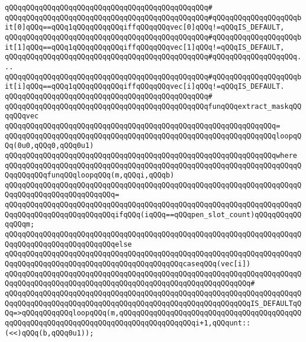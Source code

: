 \verb|qQQqqQQqqQQqqQQqqQQqqQQqqQQqqQQqqQQqqQQqqQQqqQQq#|\newline
\verb|qQQqqQQqqQQqqQQqqQQqqQQqqQQqqQQqqQQqqQQqqQQqqQQq#qQQqqQQqqQQqqQQqqQQqbit[0]qQQq==qQQq1qQQqqQQqqQQqiffqQQqqQQqvec[0]qQQq!=qQQqIS_DEFAULT,|\newline
\verb|qQQqqQQqqQQqqQQqqQQqqQQqqQQqqQQqqQQqqQQqqQQqqQQq#qQQqqQQqqQQqqQQqqQQqbit[1]qQQq==qQQq1qQQqqQQqqQQqiffqQQqqQQqvec[1]qQQq!=qQQqIS_DEFAULT,|\newline
\verb|qQQqqQQqqQQqqQQqqQQqqQQqqQQqqQQqqQQqqQQqqQQqqQQq#qQQqqQQqqQQqqQQqqQQq...|\newline
\verb|qQQqqQQqqQQqqQQqqQQqqQQqqQQqqQQqqQQqqQQqqQQqqQQq#qQQqqQQqqQQqqQQqqQQqbit[i]qQQq==qQQq1qQQqqQQqqQQqiffqQQqqQQqvec[i]qQQq!=qQQqIS_DEFAULT.|\newline
\verb|qQQqqQQqqQQqqQQqqQQqqQQqqQQqqQQqqQQqqQQqqQQqqQQq#|\newline
\verb|qQQqqQQqqQQqqQQqqQQqqQQqqQQqqQQqqQQqqQQqqQQqqQQqfunqQQqextract_maskqQQqqQQqvec|\newline
\verb|qQQqqQQqqQQqqQQqqQQqqQQqqQQqqQQqqQQqqQQqqQQqqQQqqQQqqQQqqQQqqQQq=|\newline
\verb|qQQqqQQqqQQqqQQqqQQqqQQqqQQqqQQqqQQqqQQqqQQqqQQqqQQqqQQqqQQqqQQqloopqQQq(0u0,qQQq0,qQQq0u1)|\newline
\verb|qQQqqQQqqQQqqQQqqQQqqQQqqQQqqQQqqQQqqQQqqQQqqQQqqQQqqQQqqQQqqQQqwhere|\newline
\verb|qQQqqQQqqQQqqQQqqQQqqQQqqQQqqQQqqQQqqQQqqQQqqQQqqQQqqQQqqQQqqQQqqQQqqQQqqQQqqQQqfunqQQqloopqQQq(m,qQQqi,qQQqb)|\newline
\verb|qQQqqQQqqQQqqQQqqQQqqQQqqQQqqQQqqQQqqQQqqQQqqQQqqQQqqQQqqQQqqQQqqQQqqQQqqQQqqQQqqQQqqQQqqQQqqQQq=|\newline
\verb|qQQqqQQqqQQqqQQqqQQqqQQqqQQqqQQqqQQqqQQqqQQqqQQqqQQqqQQqqQQqqQQqqQQqqQQqqQQqqQQqqQQqqQQqqQQqqQQqifqQQq(iqQQq==qQQqpen_slot_count)qQQqqQQqqQQqqQQqm;|\newline
\verb|qQQqqQQqqQQqqQQqqQQqqQQqqQQqqQQqqQQqqQQqqQQqqQQqqQQqqQQqqQQqqQQqqQQqqQQqqQQqqQQqqQQqqQQqqQQqqQQqelse|\newline
\verb|qQQqqQQqqQQqqQQqqQQqqQQqqQQqqQQqqQQqqQQqqQQqqQQqqQQqqQQqqQQqqQQqqQQqqQQqqQQqqQQqqQQqqQQqqQQqqQQqqQQqqQQqqQQqqQQqcaseqQQq(vec[i])|\newline
\verb|qQQqqQQqqQQqqQQqqQQqqQQqqQQqqQQqqQQqqQQqqQQqqQQqqQQqqQQqqQQqqQQqqQQqqQQqqQQqqQQqqQQqqQQqqQQqqQQqqQQqqQQqqQQqqQQqqQQqqQQqqQQqqQQq#|\newline
\verb|qQQqqQQqqQQqqQQqqQQqqQQqqQQqqQQqqQQqqQQqqQQqqQQqqQQqqQQqqQQqqQQqqQQqqQQqqQQqqQQqqQQqqQQqqQQqqQQqqQQqqQQqqQQqqQQqqQQqqQQqqQQqqQQqIS_DEFAULTqQQq=>qQQqqQQqqQQqloopqQQq(m,qQQqqQQqqQQqqQQqqQQqqQQqqQQqqQQqqQQqqQQqqQQqqQQqqQQqqQQqqQQqqQQqqQQqqQQqqQQqqQQqqQQqqQQqi+1,qQQqunt::(<<)qQQq(b,qQQq0u1));|\newline
